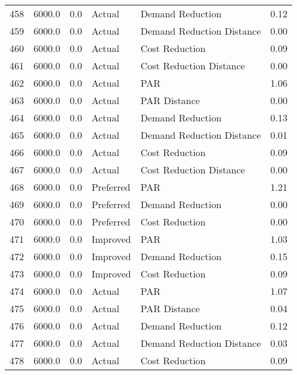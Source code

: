 \begin{longtable}{lrrllr}
458  &       6000.0 &     0.0 &         Actual &           Demand Reduction &   0.12 \\
459  &       6000.0 &     0.0 &         Actual &  Demand Reduction Distance &   0.00 \\
460  &       6000.0 &     0.0 &         Actual &             Cost Reduction &   0.09 \\
461  &       6000.0 &     0.0 &         Actual &    Cost Reduction Distance &   0.00 \\
462  &       6000.0 &     0.0 &         Actual &                        PAR &   1.06 \\
463  &       6000.0 &     0.0 &         Actual &               PAR Distance &   0.00 \\
464  &       6000.0 &     0.0 &         Actual &           Demand Reduction &   0.13 \\
465  &       6000.0 &     0.0 &         Actual &  Demand Reduction Distance &   0.01 \\
466  &       6000.0 &     0.0 &         Actual &             Cost Reduction &   0.09 \\
467  &       6000.0 &     0.0 &         Actual &    Cost Reduction Distance &   0.00 \\
468  &       6000.0 &     0.0 &      Preferred &                        PAR &   1.21 \\
469  &       6000.0 &     0.0 &      Preferred &           Demand Reduction &   0.00 \\
470  &       6000.0 &     0.0 &      Preferred &             Cost Reduction &   0.00 \\
471  &       6000.0 &     0.0 &       Improved &                        PAR &   1.03 \\
472  &       6000.0 &     0.0 &       Improved &           Demand Reduction &   0.15 \\
473  &       6000.0 &     0.0 &       Improved &             Cost Reduction &   0.09 \\
474  &       6000.0 &     0.0 &         Actual &                        PAR &   1.07 \\
475  &       6000.0 &     0.0 &         Actual &               PAR Distance &   0.04 \\
476  &       6000.0 &     0.0 &         Actual &           Demand Reduction &   0.12 \\
477  &       6000.0 &     0.0 &         Actual &  Demand Reduction Distance &   0.03 \\
478  &       6000.0 &     0.0 &         Actual &             Cost Reduction &   0.09 \\

\end{longtable}
